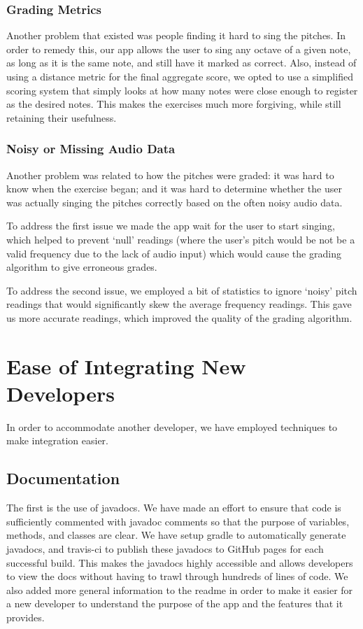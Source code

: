 \documentclass[10pt,a4paper]{article}
\begin{document}
\subsubsection{Grading Metrics}
Another problem that existed was people finding it hard to sing the pitches. In order to remedy this, our app allows the user to sing  any octave of a given note, as long as it is the same note, and still have it marked as correct. Also, instead of using a distance metric for the final aggregate score, we opted to use a simplified scoring system that simply looks at how many notes were close enough to register as the desired notes. This makes the exercises much more forgiving, while still retaining their usefulness. 
\subsubsection{Noisy or Missing Audio Data}
Another problem was related to how the pitches were graded: it was hard to know when the exercise began; and it was hard to determine whether the user was actually singing the pitches correctly based on the often noisy audio data. 

To address the first issue we made the app wait for the user to start singing, which helped to prevent ‘null’ readings (where the user’s pitch would be not be a valid frequency due to the lack of audio input) which would cause the grading algorithm to give erroneous grades.

To address the second issue, we employed a bit of statistics to ignore ‘noisy’ pitch readings that would significantly skew the average frequency readings. This gave us more accurate readings, which improved the quality of the grading algorithm. 

\section{Ease of Integrating New Developers}
In order to accommodate another developer, we have employed techniques to make integration easier. 

\subsection{Documentation}
The first is the use of javadocs. We have made an effort to ensure that code is sufficiently commented with javadoc comments so that the purpose of variables, methods, and classes are clear. We have setup gradle to automatically generate javadocs, and travis-ci to publish these javadocs to GitHub pages for each successful build. This makes the javadocs highly accessible and allows developers to view the docs without having to trawl through hundreds of lines of code. We also added more general information to the readme in order to make it easier for a new developer to understand the purpose of the app and the features that it provides. 
\end{document}
